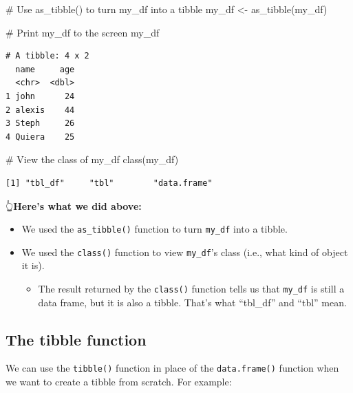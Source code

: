 \documentclass[
  letterpaper,
  DIV=11,
  numbers=noendperiod]{scrreprt}
\newenvironment{Shaded}{\begin{snugshade}}{\end{snugshade}}
\newcommand{\CommentTok}[1]{\textcolor[rgb]{0.37,0.37,0.37}{#1}}
\newcommand{\FunctionTok}[1]{\textcolor[rgb]{0.28,0.35,0.67}{#1}}
\newcommand{\NormalTok}[1]{\textcolor[rgb]{0.00,0.23,0.31}{#1}}
\newcommand{\OtherTok}[1]{\textcolor[rgb]{0.00,0.23,0.31}{#1}}
\providecommand{\tightlist}{%
  \setlength{\itemsep}{0pt}\setlength{\parskip}{0pt}}\usepackage{longtable,booktabs,array}
\begin{document}
\begin{Shaded}
\begin{Highlighting}[]
\CommentTok{\# Use as\_tibble() to turn my\_df into a tibble}
\NormalTok{my\_df }\OtherTok{\textless{}{-}} \FunctionTok{as\_tibble}\NormalTok{(my\_df)}

\CommentTok{\# Print my\_df to the screen}
\NormalTok{my\_df}
\end{Highlighting}
\end{Shaded}

\begin{verbatim}
# A tibble: 4 x 2
  name     age
  <chr>  <dbl>
1 john      24
2 alexis    44
3 Steph     26
4 Quiera    25
\end{verbatim}

\begin{Shaded}
\begin{Highlighting}[]
\CommentTok{\# View the class of my\_df}
\FunctionTok{class}\NormalTok{(my\_df)}
\end{Highlighting}
\end{Shaded}

\begin{verbatim}
[1] "tbl_df"     "tbl"        "data.frame"
\end{verbatim}

👆\textbf{Here's what we did above:}

\begin{itemize}
\item
  We used the \texttt{as\_tibble()} function to turn \texttt{my\_df}
  into a tibble.
\item
  We used the \texttt{class()} function to view \texttt{my\_df}'s class
  (i.e., what kind of object it is).

  \begin{itemize}
  \tightlist
  \item
    The result returned by the \texttt{class()} function tells us that
    \texttt{my\_df} is still a data frame, but it is also a tibble.
    That's what ``tbl\_df'' and ``tbl'' mean.
  \end{itemize}
\end{itemize}

\subsection{The tibble function}\label{the-tibble-function}

We can use the \texttt{tibble()} function in place of the
\texttt{data.frame()} function when we want to create a tibble from
scratch. For example:
\end{document}
